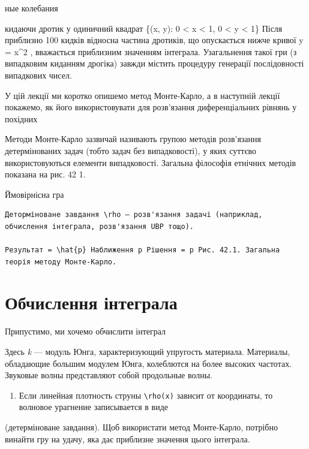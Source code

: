 \documentclass[
  ukrainian,
]{article}
\providecommand{\tightlist}{%
  \setlength{\itemsep}{0pt}\setlength{\parskip}{0pt}}
\begin{document}
ные колебания

кидаючи дротик у одиничний квадрат \{(x, y): 0 \textless{} x \textless{}
1, 0 \textless{} y \textless{} 1\} Після приблизно 100 кидків відносна
частина дротиків, що опускається нижче кривої y = x\^{}2 , вважається
приблизним значенням інтеграла. Узагальнення такої гри (з випадковим
киданням дрогіка) завжди містить процедуру генерації послідовності
випадкових чисел.

У цій лекції ми коротко опишемо метод Монте-Карло, а в наступній лекції
покажемо, як його використовувати для розв'язання диференціальних
рівнянь у похідних

Методи Монте-Карло зазвичай називають групою методів розв'язання
детермінованих задач (тобто задач без випадковості), у яких суттєво
використовуються елементи випадковості. Загальна філософія етнічних
методів показана на рис. 42 1.

Ймовірнісна гра

\begin{verbatim}
Деторміноване завдання \rho — розв'язання задачі (наприклад, обчислення інтеграла, розв'язання UBP тощо).

Результат = \hat{p} Наближення p Рішення = p Рис. 42.1. Загальна теорія методу Монте-Карло.
\end{verbatim}

\section{Обчислення
інтеграла}\label{ux43eux431ux447ux438ux441ux43bux435ux43dux43dux44f-ux456ux43dux442ux435ux433ux440ux430ux43bux430}

Припустимо, ми хочемо обчислити інтеграл

Здесь \emph{k} --- модуль Юнга, характеризующий упругость материала.
Материалы, обладающие большим модулем Юнга, колеблются на более высоких
частотах. Звуковые волны представляют собой продольные волны.

\begin{enumerate}
\def\labelenumi{\arabic{enumi}.}
\setcounter{enumi}{1}
\tightlist
\item
  Если линейная плотность струны \texttt{\textbackslash{}rho(x)} зависит
  от координаты, то волновое урагнение записывается в виде
\end{enumerate}

(детерміноване завдання). Щоб використати метод Монте-Карло, потрібно
винайти гру на удачу, яка дає приблизне значення цього інтеграла.
\end{document}

